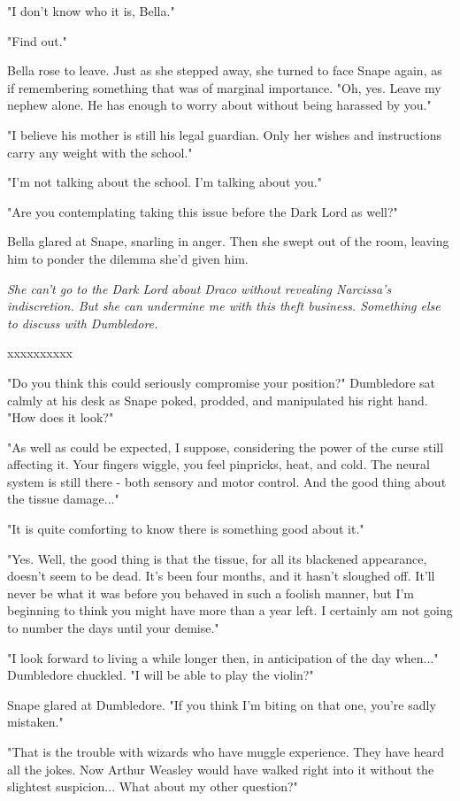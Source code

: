 \documentclass[a4paper,11pt]{article}
\begin{document}
"I don't know who it is, Bella."

"Find out."

Bella rose to leave. Just as she stepped away, she turned to face Snape again, as if remembering something that was of marginal importance. "Oh, yes. Leave my nephew alone. He has enough to worry about without being harassed by you."

"I believe his mother is still his legal guardian. Only her wishes and instructions carry any weight with the school."

"I'm not talking about the school. I'm talking about you."

"Are you contemplating taking this issue before the Dark Lord as well?"

Bella glared at Snape, snarling in anger. Then she swept out of the room, leaving him to ponder the dilemma she'd given him.

\emph{She can't go to the Dark Lord about Draco without revealing Narcissa's indiscretion. But she can undermine me with this theft business. Something else to discuss with Dumbledore.}

xxxxxxxxxx

"Do you think this could seriously compromise your position?" Dumbledore sat calmly at his desk as Snape poked, prodded, and manipulated his right hand. "How does it look?"

"As well as could be expected, I suppose, considering the power of the curse still affecting it. Your fingers wiggle, you feel pinpricks, heat, and cold. The neural system is still there - both sensory and motor control. And the good thing about the tissue damage..."

"It is quite comforting to know there is something good about it."

"Yes. Well, the good thing is that the tissue, for all its blackened appearance, doesn't seem to be dead. It's been four months, and it hasn't sloughed off. It'll never be what it was before you behaved in such a foolish manner, but I'm beginning to think you might have more than a year left. I certainly am not going to number the days until your demise."

"I look forward to living a while longer then, in anticipation of the day when..." Dumbledore chuckled. "I will be able to play the violin?"

Snape glared at Dumbledore. "If you think I'm biting on that one, you're sadly mistaken."

"That is the trouble with wizards who have muggle experience. They have heard all the jokes. Now Arthur Weasley would have walked right into it without the slightest suspicion... What about my other question?"
\end{document}
